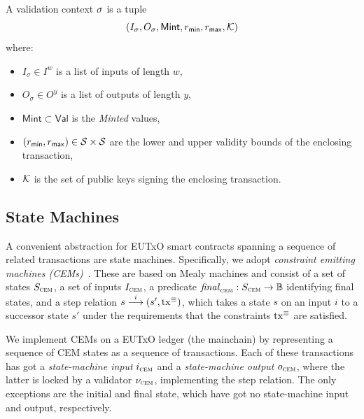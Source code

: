 \begin{definition}

A validation context $\sigma$ is a tuple  
$$(I_\sigma, O_\sigma, \mathsf{Mint}, r_{\mathsf{min}}, r_{\mathsf{max}}, \mathcal K)$$
where:
\begin{itemize}
    \item $I_\sigma \in I^w$ is a list of inputs of length $w$,
    \item $O_\sigma \in O^y$ is a list of outputs of length $y$,
    \item $\mathsf{Mint} \subset \mathsf{Val}$ is the \emph{Minted} values,
    \item $(r_{\mathsf{min}}, r_{\mathsf{max}}) \in \mathcal{S} \times \mathcal{S}$ are the lower and upper validity bounds of the enclosing transaction, 
    \item $\mathcal K$ is the set of public keys signing the enclosing transaction.
\end{itemize}

\end{definition}

\subsection{State Machines}\label{sec:cem}
A convenient abstraction for EUTxO smart contracts spanning a sequence
of related transactions are state machines. Specifically, we adopt
\emph{constraint emitting machines (CEMs)}~\cite{eutxo}. These are
based on Mealy machines and consist of a set of states $S_{\textsc{cem}}$, a set
of inputs $I_{\textsc{cem}}$, a predicate \(\mathit{final}_{\textsc{cem}} : S_{\textsc{cem}}\to\mathbb{B}\)
identifying final states, and a step relation
\({s}\overset{i}\longrightarrow(s', \mathrm{tx}^\equiv)\), which takes a state $s$ on an
input $i$ to a successor state $s'$ under the requirements that the
constraints $\mathrm{tx}^\equiv$ are satisfied.

We implement CEMs on a EUTxO ledger (the mainchain) by representing a sequence of CEM states as a sequence of transactions. Each of these transactions has got a \emph{state-machine input} $i_{\textsc{cem}}$ and a \emph{state-machine output} $o_{\textsc{cem}}$, where the latter is locked by a validator $\nu_{\textsc{cem}}$, implementing the step relation. The only exceptions are the initial and final state, which have got no state-machine input and output, respectively.

